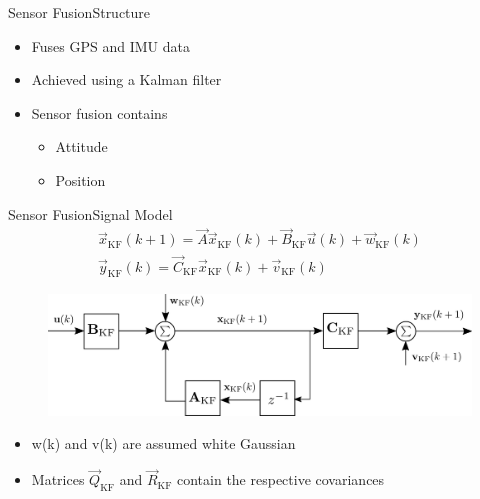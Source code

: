 \begin{frame}{Sensor Fusion}{Structure}
	\begin{itemize}

		\item Fuses GPS and IMU data
		\item Achieved using a Kalman filter
		\item Sensor fusion contains
			\begin{itemize}
		\item Attitude
		\item Position
			\end{itemize}
	\end{itemize}

\end{frame}
\begin{frame}{Sensor Fusion}{Signal Model}
	\begin{gather*}
    \vec{x}_\mathrm{KF}(k+1) = \vec{A}\vec{x}_\mathrm{KF}(k) + \vec{B}_\mathrm{KF} \vec{u}(k) + \vec{w}_\mathrm{KF}(k)  \nonumber \\
    \vec{y}_\mathrm{KF}(k) = \vec{C}_\mathrm{KF} \vec{x}_\mathrm{KF}(k) + \vec{v}_\mathrm{KF}(k)  \nonumber
    \end{gather*}
    \begin{figure}[H]
        \centering
        \includegraphics[width=.7\linewidth]{figures/signalModel}
    \end{figure}

	\begin{itemize}
		\item w(k) and v(k) are assumed white Gaussian
		\item Matrices $\vec{Q}_\mathrm{KF}$ and $\vec{R}_\mathrm{KF}$ contain the respective covariances
	\end{itemize}

\end{frame}


